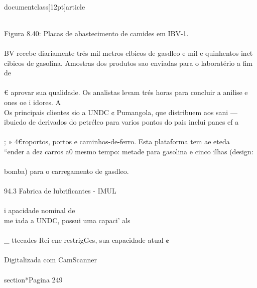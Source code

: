 \\documentclass[12pt]{article}
\begin{document}
\\
Figura 8.40: Placas de abastecimento de camides em IBV-1.\\
\\
BV recebe diariamente trés mil metros clbicos de gasdleo e mil e quinhentos inet\\
cibicos de gasolina. Amostras dos produtos sao enviadas para o laboratério a fim de\\
\\
€ aprovar sua qualidade. Os analistas levam trés horas para concluir a anilise e\\
ones oe i idores. A\\
Os principais clientes sio a UNDC ¢ Pumangola, que distribuem aos sani —\\
ibuicdo de derivados do petréleo para varios pontos do pais inclui panes ef a\\
\\
; » 4€roportos, portos e caminhos-de-ferro. Esta plataforma tem ae eteda\\
“ender a dez carros a0 mesmo tempo: metade para gasolina e cinco ilhas (design:\\
\\
bomba) para o carregamento de gasdleo.\\
\\
94.3 Fabrica de lubrificantes - IMUL\\
\\
i apacidade nominal de\\
me iada a UNDC, possui uma capaci’ als\\
\\_ ttecades Rei ene restrigGes, sua capacidade atual ¢\\
\\
Digitalizada com CamScanner\\

\\section*{Pagina 249}
\end{document}
